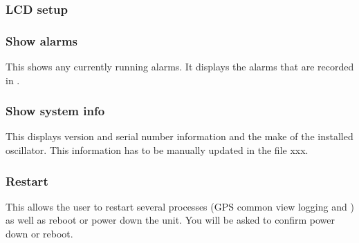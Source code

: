 \subsubsection{LCD setup}


\subsubsection{Show alarms}

This shows any currently running alarms.
It displays the alarms that are recorded in .

\subsubsection{Show system info}

This displays version and serial number information and the make of the installed oscillator.
This information has to be manually updated in the file xxx.
  
\subsubsection{Restart}

This allows the user to restart several processes (GPS common view logging and ) as well as reboot or power down the unit. 
You will be asked to confirm power down or reboot.
